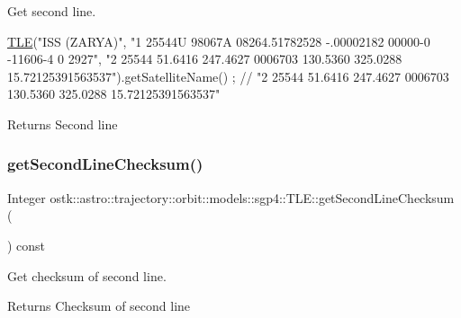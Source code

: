 Get second line. 


\begin{DoxyCode}
\hyperlink{classostk_1_1astro_1_1trajectory_1_1orbit_1_1models_1_1sgp4_1_1_t_l_e_a57323db2c24577c2e8ddce79fa776d1e}{TLE}(\textcolor{stringliteral}{"ISS (ZARYA)"},
    \textcolor{stringliteral}{"1 25544U 98067A   08264.51782528 -.00002182  00000-0 -11606-4 0  2927"},
    \textcolor{stringliteral}{"2 25544  51.6416 247.4627 0006703 130.5360 325.0288 15.72125391563537"}).getSatelliteName() ; \textcolor{comment}{// "2
       25544  51.6416 247.4627 0006703 130.5360 325.0288 15.72125391563537"}
\end{DoxyCode}


\begin{DoxyReturn}{Returns}
Second line 
\end{DoxyReturn}
\mbox{\label{classostk_1_1astro_1_1trajectory_1_1orbit_1_1models_1_1sgp4_1_1_t_l_e_a66f25eab1f7e8f7e511ad0a77da90de7}} 
\subsubsection{\texorpdfstring{get\+Second\+Line\+Checksum()}{getSecondLineChecksum()}}
{\footnotesize\ttfamily Integer ostk\+::astro\+::trajectory\+::orbit\+::models\+::sgp4\+::\+T\+L\+E\+::get\+Second\+Line\+Checksum (\begin{DoxyParamCaption}{ }\end{DoxyParamCaption}) const}



Get checksum of second line. 

\begin{DoxyReturn}{Returns}
Checksum of second line 
\end{DoxyReturn}
\mbox{\label{classostk_1_1astro_1_1trajectory_1_1orbit_1_1models_1_1sgp4_1_1_t_l_e_aa7fa1003a2b03fb7f3829bfdd342942f}} 
